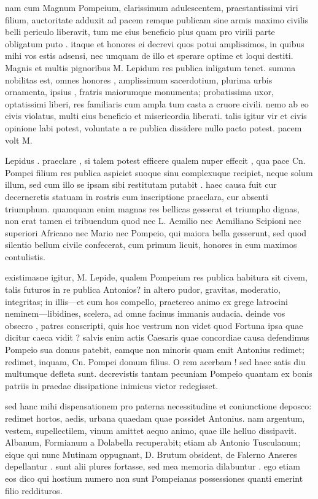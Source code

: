  nam cum Magnum Pompeium, clarissimum adulescentem, praestantissimi viri filium, auctoritate adduxit ad pacem remque publicam sine armis maximo civilis belli periculo liberavit, tum me eius beneficio plus quam pro virili parte obligatum puto . itaque et honores ei decrevi quos potui amplissimos, in quibus mihi vos estis adsensi, nec umquam de illo et sperare optime et loqui destiti. Magnis et multis pignoribus M. Lepidum res publica inligatum tenet. summa nobilitas est, omnes honores , amplissimum sacerdotium, plurima urbis ornamenta, ipsius , fratris maiorumque monumenta; probatissima uxor, optatissimi liberi, res familiaris cum ampla tum casta a cruore civili. nemo ab eo civis violatus, multi eius beneficio et misericordia liberati. talis igitur vir et civis opinione labi potest, voluntate a re publica dissidere nullo pacto potest. pacem volt M.

 Lepidus . praeclare , si talem potest efficere qualem nuper effecit , qua pace Cn. Pompei filium res publica aspiciet suoque sinu complexuque recipiet, neque solum illum, sed cum illo se ipsam sibi restitutam putabit . haec causa fuit cur decerneretis statuam in rostris cum inscriptione praeclara, cur absenti triumphum. quamquam enim magnas res bellicas gesserat et triumpho dignas, non erat tamen ei tribuendum quod nec L. Aemilio nec Aemiliano Scipioni nec superiori Africano nec Mario nec Pompeio, qui maiora bella gesserunt, sed quod silentio bellum civile confecerat, cum primum licuit, honores in eum maximos contulistis.

 existimasne igitur, M. Lepide, qualem Pompeium res publica habitura sit civem, talis futuros in re publica Antonios? in altero pudor, gravitas, moderatio, integritas; in illis—et cum hos compello, praetereo animo ex grege latrocini neminem—libidines, scelera, ad omne facinus immanis audacia. deinde vos obsecro , patres conscripti, quis hoc vestrum non videt quod Fortuna ipsa quae dicitur caeca vidit ? salvis enim actis Caesaris quae concordiae causa defendimus Pompeio sua domus patebit, eamque non minoris quam emit Antonius redimet; redimet, inquam, Cn. Pompei domum filius. O rem acerbam ! sed haec satis diu multumque defleta sunt. decrevistis tantam pecuniam Pompeio quantam ex bonis patriis in praedae dissipatione inimicus victor redegisset.

 sed hanc mihi dispensationem pro paterna necessitudine et coniunctione deposco: redimet hortos, aedis, urbana quaedam quae possidet Antonius. nam argentum, vestem, supellectilem, vinum amittet aequo animo, quae ille helluo dissipavit. Albanum, Formianum a Dolabella recuperabit; etiam ab Antonio Tusculanum; eique qui nunc Mutinam oppugnant, D. Brutum obsident, de Falerno Anseres depellantur . sunt alii plures fortasse, sed mea memoria dilabuntur . ego etiam eos dico qui hostium numero non sunt Pompeianas possessiones quanti emerint filio reddituros.

